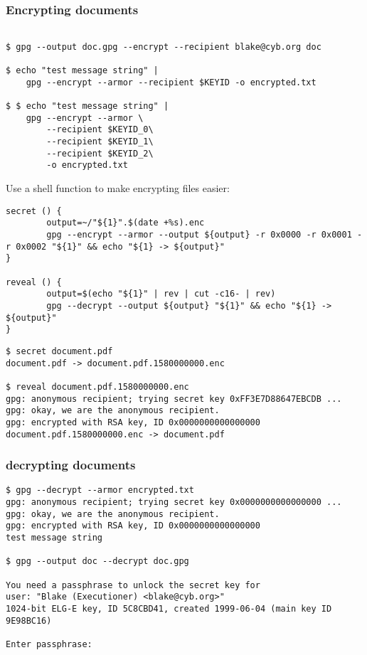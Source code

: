 \subsubsection{Encrypting documents}

\begin{verbatim}

$ gpg --output doc.gpg --encrypt --recipient blake@cyb.org doc

$ echo "test message string" |
    gpg --encrypt --armor --recipient $KEYID -o encrypted.txt

$ $ echo "test message string" |
    gpg --encrypt --armor \
        --recipient $KEYID_0\
        --recipient $KEYID_1\
        --recipient $KEYID_2\
        -o encrypted.txt
\end{verbatim}

Use a shell function to make encrypting files easier:
\begin{verbatim}
secret () {
        output=~/"${1}".$(date +%s).enc
        gpg --encrypt --armor --output ${output} -r 0x0000 -r 0x0001 -r 0x0002 "${1}" && echo "${1} -> ${output}"
}

reveal () {
        output=$(echo "${1}" | rev | cut -c16- | rev)
        gpg --decrypt --output ${output} "${1}" && echo "${1} -> ${output}"
}
\end{verbatim}


\begin{verbatim}
$ secret document.pdf
document.pdf -> document.pdf.1580000000.enc

$ reveal document.pdf.1580000000.enc
gpg: anonymous recipient; trying secret key 0xFF3E7D88647EBCDB ...
gpg: okay, we are the anonymous recipient.
gpg: encrypted with RSA key, ID 0x0000000000000000
document.pdf.1580000000.enc -> document.pdf
\end{verbatim}


\subsubsection{decrypting documents}
\begin{verbatim}
$ gpg --decrypt --armor encrypted.txt
gpg: anonymous recipient; trying secret key 0x0000000000000000 ...
gpg: okay, we are the anonymous recipient.
gpg: encrypted with RSA key, ID 0x0000000000000000
test message string

$ gpg --output doc --decrypt doc.gpg

You need a passphrase to unlock the secret key for
user: "Blake (Executioner) <blake@cyb.org>"
1024-bit ELG-E key, ID 5C8CBD41, created 1999-06-04 (main key ID 9E98BC16)

Enter passphrase:
\end{verbatim}

